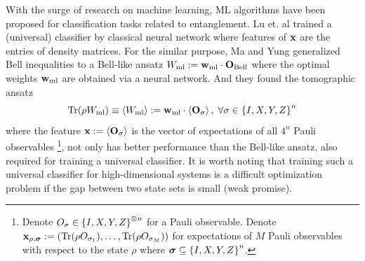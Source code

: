 \documentclass[
aps,
pra,
twocolumn,
floatfix,
]{revtex4-2}
\theoremstyle{plain}
\theoremstyle{definition}
\newcommand{\ew}{W}
\newcommand{\pob}{O}
\newcommand{\dm}{\rho}
\newcommand{\ml}{\text{ml}}
\newcommand{\bellineq}{\textup{Bell}}
\newcommand{\sx}{\hat{\sigma}_x}
\newcommand{\sy}{\hat{\sigma}_y}
\newcommand{\sz}{\hat{\sigma}_z}
\newcommand{\bmsigma}{\bm{\sigma}}
\begin{document}
With the surge of research on machine learning, ML algorithms have been proposed for classification tasks related to entanglement.
Lu et. al \cite{luSeparabilityEntanglementClassifierMachine2018} 
trained a (universal)  classifier by classical neural network
where features of $\vb{x}$ are the entries of density matrices.
For the similar purpose, Ma and Yung \cite{maTransformingBellInequalities2018} generalized Bell inequalities to a Bell-like ansatz $\ew_{\ml}:=\vbw_{\ml}\cdot\vb{\pob}_{\bellineq}$ where the optimal weights $\vbw_{\ml}$ are obtained via a neural network.
And they found the tomographic ansatz
\begin{equation}
	\Tr(\dm\ew_{\ml}) \equiv\expval{\ew_{\ml}} := 
	\vbw_{\ml} \cdot \expval{\vb{\pob}_{\sigma}}, 
	\; \forall \sigma \in  \qty{I,X,Y,Z}^n
	\label{eq:tomographic_ansatz}
\end{equation}
where the feature $\vbx:=\expval{\vb{\pob}_{\sigma}}$ is the vector of expectations of all $4^n$ Pauli observables
\footnote{
	Denote $\pob_{\sigma}\in \qty{I,X,Y,Z}^{\otimes n}$ for a Pauli observable.
	Denote $\vbx_{\dm,\bmsigma}:=(\Tr(\dm\pob_{\sigma_1}),\dots,\Tr(\dm\pob_{\sigma_M}))$ for expectations of $M$ Pauli observables with respect to the state $\dm$ where $\bmsigma\subseteq \qty{I,X,Y,Z}^n$.
},
not only has better performance than the Bell-like ansatz, 
also required \cite{luTomographyNecessaryUniversal2016} for training a universal  classifier.
It is worth noting that training such a universal classifier for high-dimensional systems is a difficult optimization problem if the gap between two state sets is small (weak promise).
\end{document}
